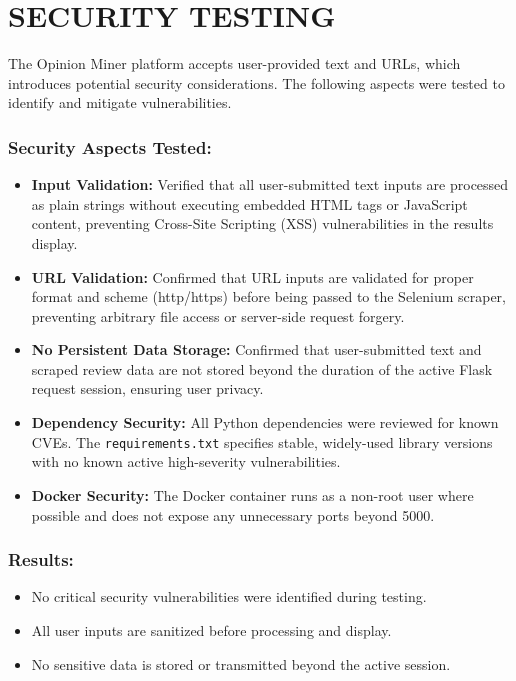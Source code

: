 \documentclass[12pt,a4paper]{report}
\begin{document}
\section{SECURITY TESTING}

The Opinion Miner platform accepts user-provided text and URLs, which introduces potential security considerations. The following aspects were tested to identify and mitigate vulnerabilities.

\subsubsection*{Security Aspects Tested:}

\begin{itemize}
  \item \textbf{Input Validation:} Verified that all user-submitted text inputs are processed as plain strings without executing embedded HTML tags or JavaScript content, preventing Cross-Site Scripting (XSS) vulnerabilities in the results display.

  \item \textbf{URL Validation:} Confirmed that URL inputs are validated for proper format and scheme (http/https) before being passed to the Selenium scraper, preventing arbitrary file access or server-side request forgery.

  \item \textbf{No Persistent Data Storage:} Confirmed that user-submitted text and scraped review data are not stored beyond the duration of the active Flask request session, ensuring user privacy.

  \item \textbf{Dependency Security:} All Python dependencies were reviewed for known CVEs. The \texttt{requirements.txt} specifies stable, widely-used library versions with no known active high-severity vulnerabilities.

  \item \textbf{Docker Security:} The Docker container runs as a non-root user where possible and does not expose any unnecessary ports beyond 5000.
\end{itemize}

\subsubsection*{Results:}

\begin{itemize}
  \item No critical security vulnerabilities were identified during testing.
  \item All user inputs are sanitized before processing and display.
  \item No sensitive data is stored or transmitted beyond the active session.
\end{itemize}
\end{document}
